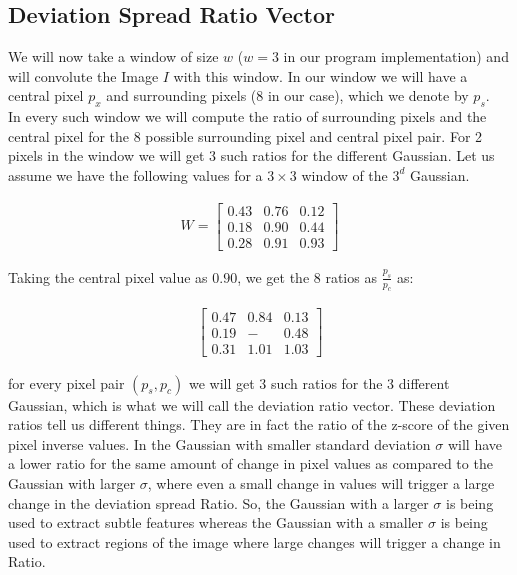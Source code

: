 \documentclass{article}
\begin{document}
\clearpage
\subsection{Deviation Spread Ratio Vector}
We will now take a window of size $w$ ($w = 3$ in our program implementation) and will convolute the Image
$I$ with this window. In our window we will have a central pixel $p_x$ and surrounding pixels (8 in our case), which we denote by $p_s$.  \\

In every such window we will compute the ratio of surrounding pixels and the central pixel for the 8 possible surrounding pixel and central pixel pair. For 2 pixels in the window we will get 3 such ratios 
for the different Gaussian. Let us assume we have the following values for a $3 \times 3$ window of the
$3^d$ Gaussian.

\begin{align*}
    W = \begin{bmatrix}
        0.43 & 0.76 & 0.12 \\
        0.18 & 0.90 & 0.44 \\
        0.28 & 0.91 & 0.93
    \end{bmatrix}
\end{align*}


Taking the central pixel value as $0.90$, we get the 8 ratios as $\frac{p_s}{p_c}$  as:

\begin{align*}
    \begin{bmatrix}
        0.47 & 0.84 & 0.13 \\
        0.19 & - & 0.48 \\
        0.31 & 1.01 & 1.03
    \end{bmatrix}
\end{align*}

for every pixel pair $(p_s, p_c)$ we will get 3 such ratios for the 3 different Gaussian, which is what 
we will call the deviation ratio vector. These deviation ratios tell us different things. They are in fact the ratio of the z-score of the given pixel inverse values. In the Gaussian with smaller standard deviation $\sigma$ will have a lower ratio for the same amount of change in pixel values as compared to
the Gaussian with larger $\sigma$, where even a small change in values will trigger a large change in 
the deviation spread Ratio. So, the Gaussian with a larger $\sigma$ is being used to extract subtle 
features whereas the Gaussian with a smaller $\sigma$ is being used to extract regions of the image where
large changes will trigger a change in Ratio. \\
\end{document}
